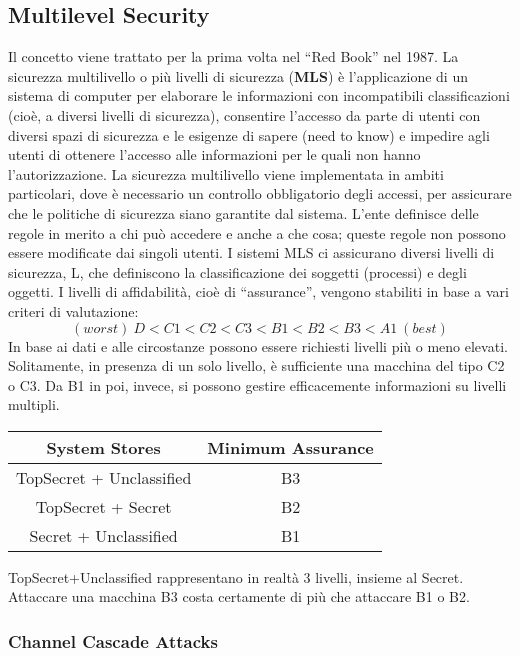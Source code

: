 \subsection{Multilevel Security}
Il concetto viene trattato per la prima volta nel ``Red Book'' nel 1987.
La sicurezza multilivello o più livelli di sicurezza (\textbf{MLS}) è
l'applicazione di un sistema di computer
per elaborare le informazioni con incompatibili classificazioni (cioè, a diversi
livelli di sicurezza),
consentire l'accesso da parte di utenti con diversi spazi di sicurezza e le
esigenze di sapere (need
to know) e impedire agli utenti di ottenere l'accesso alle informazioni per
le quali non hanno
l'autorizzazione.
La sicurezza multilivello viene implementata in ambiti particolari, dove è
necessario un controllo
obbligatorio degli accessi, per assicurare che le politiche di sicurezza siano
garantite dal sistema.
L'ente definisce delle regole in merito a chi può accedere e anche a che cosa;
queste regole non
possono essere modificate dai singoli utenti.
I sistemi MLS ci assicurano diversi livelli di sicurezza, L, che definiscono la
classificazione dei
soggetti (processi) e degli oggetti. I livelli di affidabilità, cioè di
``assurance'', vengono stabiliti in
base a vari criteri di valutazione:
\[
    (worst) \ D<C1<C2<C3<B1<B2<B3<A1 \ (best)
\]
In base ai dati e alle circostanze possono essere richiesti livelli più o meno
elevati. Solitamente, in
presenza di un solo livello, è sufficiente una macchina del tipo C2 o C3. Da B1
in poi, invece, si
possono gestire efficacemente informazioni su livelli multipli.
\begin{center}
    \begin{tabular}{ |c|c| }
        \hline
        \textbf{System Stores}   & \textbf{Minimum Assurance} \\
        \hline
        TopSecret + Unclassified & B3                         \\
        \hline
        TopSecret + Secret       & B2                         \\
        \hline
        Secret + Unclassified    & B1                         \\
        \hline
    \end{tabular}
\end{center}
TopSecret+Unclassified rappresentano in realtà 3 livelli, insieme al Secret.
Attaccare una macchina B3 costa certamente di più che attaccare B1 o B2.

\subsubsection{Channel Cascade Attacks}

